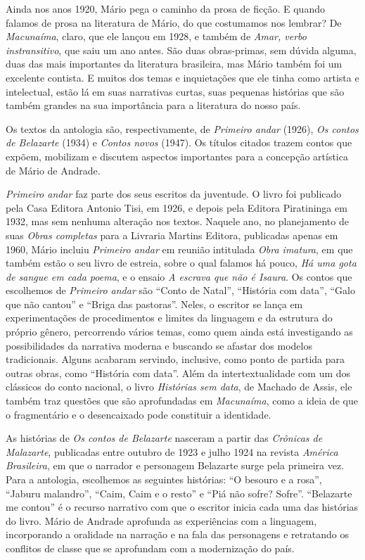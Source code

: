 \documentclass{article}
\begin{document}
Ainda nos anos 1920, Mário pega o caminho da prosa de ficção. E quando
falamos de prosa na literatura de Mário, do que costumamos nos lembrar?
De \emph{Macunaíma}, claro, que ele lançou em 1928, e também de
\emph{Amar, verbo instransitivo}, que saiu um ano antes. São duas
obras-primas, sem dúvida alguma, duas das mais importantes da literatura
brasileira, mas Mário também foi um excelente contista. E muitos dos
temas e inquietações que ele tinha como artista e intelectual, estão lá
em suas narrativas curtas, suas pequenas histórias que são também
grandes na sua importância para a literatura do nosso país.

Os textos da antologia são, respectivamente, de \emph{Primeiro andar}
(1926), \emph{Os contos de Belazarte} (1934) e \emph{Contos novos}
(1947). Os títulos citados trazem contos que expõem, mobilizam e
discutem aspectos importantes para a concepção artística de Mário de
Andrade.

\emph{Primeiro andar} faz parte dos seus escritos da juventude. O livro
foi publicado pela Casa Editora Antonio Tisi, em 1926, e depois pela
Editora Piratininga em 1932, mas sem nenhuma alteração nos textos.
Naquele ano, no planejamento de suas \emph{Obras completas} para a
Livraria Martins Editora, publicadas apenas em 1960, Mário incluiu
\emph{Primeiro andar} em reunião intitulada \emph{Obra imatura}, em que
também estão o seu livro de estreia, sobre o qual falamos há pouco,
\emph{Há uma gota de sangue em cada poema}, e o ensaio \emph{A escrava
que não é Isaura}. Os contos que escolhemos de \emph{Primeiro andar} são
``Conto de Natal'', ``História com data'', ``Galo que não cantou'' e
``Briga das pastoras''. Neles, o escritor se lança em experimentações de
procedimentos e limites da linguagem e da estrutura do próprio gênero,
percorrendo vários temas, como quem ainda está investigando as
possibilidades da narrativa moderna e buscando se afastar dos modelos
tradicionais. Alguns acabaram servindo, inclusive, como ponto de partida
para outras obras, como ``História com data''. Além da intertextualidade
com um dos clássicos do conto nacional, o livro \emph{Histórias sem
data}, de Machado de Assis, ele também traz questões que são
aprofundadas em \emph{Macunaíma}, como a ideia de que o fragmentário e o
desencaixado pode constituir a identidade.

As histórias de \emph{Os contos de Belazarte} nasceram a partir das
\emph{Crônicas de Malazarte}, publicadas entre outubro de 1923 e julho
1924 na revista \emph{América Brasileira}, em que o narrador e
personagem Belazarte surge pela primeira vez. Para a antologia,
escolhemos as seguintes histórias: ``O besouro e a rosa'', ``Jaburu
malandro'', ``Caim, Caim e o resto'' e ``Piá não sofre? Sofre''.
``Belazarte me contou'' é o recurso narrativo com que o escritor inicia
cada uma das histórias do livro. Mário de Andrade aprofunda as
experiências com a linguagem, incorporando a oralidade na narração e na
fala das personagens e retratando os conflitos de classe que se
aprofundam com a modernização do país.
\end{document}
